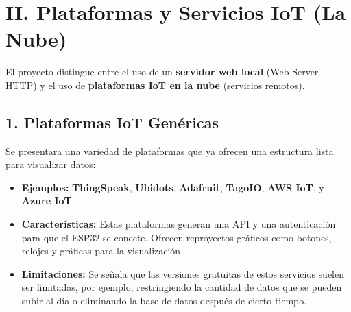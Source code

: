 \documentclass{article}
\begin{document}
\section*{II. Plataformas y Servicios IoT (La Nube)}

El proyecto distingue entre el uso de un \textbf{servidor web local} 
(Web Server HTTP) y el uso de \textbf{plataformas IoT en la nube} 
(servicios remotos).

\subsection*{1. Plataformas IoT Genéricas}
Se presentara una variedad de plataformas que ya ofrecen una estructura 
lista para visualizar datos:
\begin{itemize}
    \item \textbf{Ejemplos:} \textbf{ThingSpeak}, \textbf{Ubidots}, 
    \textbf{Adafruit}, \textbf{TagoIO}, \textbf{AWS IoT}, y 
    \textbf{Azure IoT}.
    \item \textbf{Características:} Estas plataformas generan una API y 
    una autenticación para que el ESP32 se conecte. Ofrecen 
    reproyectos gráficos como botones, relojes y gráficas para la 
    visualización.
    \item \textbf{Limitaciones:} Se señala que las versiones gratuitas 
    de estos servicios suelen ser limitadas, por ejemplo, restringiendo 
    la cantidad de datos que se pueden subir al día o eliminando la base 
    de datos después de cierto tiempo.
\end{itemize}
\end{document}
